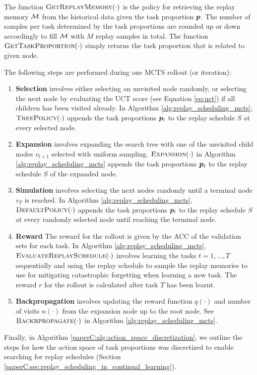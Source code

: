 The function $\textsc{GetReplayMemory}(\cdot)$ is the policy for retrieving the replay memory ${\mathcal{M}}$ from the historical data given the task proportion ${\bm{p}}$. The number of samples per task determined by the task proportions are rounded up or down accordingly to fill ${\mathcal{M}}$ with $M$ replay samples in total. 
The function $\textsc{GetTaskProportion}(\cdot)$ simply returns the task proportion that is related to given node. 


The following steps are performed during one MCTS rollout (or iteration):
\begin{enumerate}[leftmargin=*, topsep=0pt]
	\item {\bf Selection} involves either selecting an unvisited node randomly, or selecting the next node by evaluating the UCT score (see Equation \ref{eq:uct}) if all children has been visited already. In Algorithm \ref{alg:replay_scheduling_mcts}, $\textsc{TreePolicy}(\cdot)$ appends the task proportions ${\bm{p}}_t$ to the replay schedule $S$ at every selected node. 
	
	\item {\bf Expansion} involves expanding the search tree with one of the unvisited child nodes $v_{t+1}$ selected with uniform sampling. $\textsc{Expansion}(\cdot)$ in Algorithm \ref{alg:replay_scheduling_mcts} appends the task proportions ${\bm{p}}_t$ to the replay schedule $S$ of the expanded node. 
	
	\item {\bf Simulation} involves selecting the next nodes randomly until a terminal node $v_T$ is reached. In Algorithm \ref{alg:replay_scheduling_mcts}, $\textsc{DefaultPolicy}(\cdot)$ appends the task proportions ${\bm{p}}_t$ to the replay schedule $S$ at every randomly selected node until reaching the terminal node.  
	
	\item {\bf Reward} The reward for the rollout is given by the ACC of the validation sets for each task. In Algorithm \ref{alg:replay_scheduling_mcts}, $\textsc{EvaluateReplaySchedule}(\cdot)$ involves learning the tasks $t= 1, \dots, T$ sequentially and using the replay schedule to sample the replay memories to use for mitigating catastrophic forgetting when learning a new task. The reward $r$ for the rollout is calculated after task $T$ has been learnt. 
	
	\item {\bf Backpropagation} involves updating the reward function $q(\cdot)$ and number of visits $n(\cdot)$ from the expansion node up to the root node. See $\textsc{Backrpropagate}(\cdot)$ in Algorithm \ref{alg:replay_scheduling_mcts}.
\end{enumerate}
Finally, in Algorithm \ref{paperC:alg:action_space_discretization}, we outline the steps for how the action space of task proportions was discretized to enable searching for replay schedules (Section \ref{paperC:sec:replay_scheduling_in_continual_learning}). 

